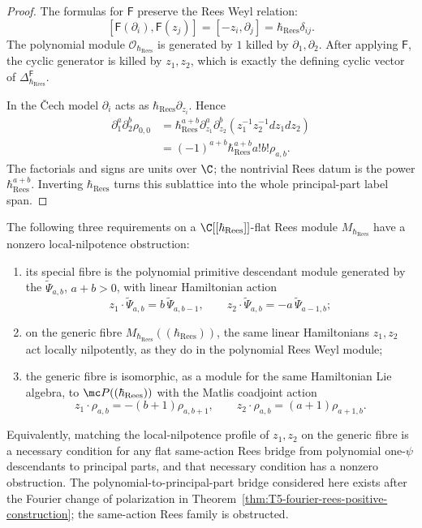 \begin{proof}
  The formulas for \(\mathsf F\) preserve the Rees Weyl relation:
  \[
    [\mathsf F(\partial_i),\mathsf F(z_j)]
      =[-z_i,\partial_j]=\hbar_{\mathrm{Rees}}\delta_{ij}.
  \]
  The polynomial module \(\mathcal O_{\hbar_{\mathrm{Rees}}}\) is generated by \(1\)
  killed by \(\partial_1,\partial_2\).  After applying \(\mathsf F\), the
  cyclic generator is killed by \(z_1,z_2\), which is exactly the
  defining cyclic vector of \(\Delta^{\mathsf F}_{\hbar_{\mathrm{Rees}}}\).

  In the \v{C}ech model \(\partial_i\) acts as
  \(\hbar_{\mathrm{Rees}}\partial_{z_i}\).  Hence
  \[
  \begin{aligned}
    \partial_1^a\partial_2^b\rho_{0,0}
      &=
      \hbar_{\mathrm{Rees}}^{a+b}
      \partial_{z_1}^a\partial_{z_2}^b
      (z_1^{-1}z_2^{-1}dz_1dz_2)  \\
      &=(-1)^{a+b}\hbar_{\mathrm{Rees}}^{a+b}a!b!\rho_{a,b}.
  \end{aligned}
  \]
  The factorials and signs are units over \(\C\); the nontrivial Rees
  datum is the power \(\hbar_{\mathrm{Rees}}^{a+b}\).  Inverting \(\hbar_{\mathrm{Rees}}\) turns this
  sublattice into the whole principal-part label span.
\end{proof}

\begin{thm}
  \label{thm:same-action-rees-fourier-descendants-obstruction}
  The following three requirements on a \(\C[[\hbar_{\mathrm{Rees}}]]\)-flat Rees module
  \(M_{\hbar_{\mathrm{Rees}}}\) have a nonzero local-nilpotence obstruction:
  \begin{enumerate}
    \item its special fibre is the polynomial primitive descendant module
      generated by the \(\widetilde\Psi_{a,b}\), \(a+b>0\), with linear
      Hamiltonian action
      \[
        z_1\cdot\widetilde\Psi_{a,b}=b\,\widetilde\Psi_{a,b-1},
        \qquad
        z_2\cdot\widetilde\Psi_{a,b}=-a\,\widetilde\Psi_{a-1,b};
      \]
    \item on the generic fibre \(M_{\hbar_{\mathrm{Rees}}}((\hbar_{\mathrm{Rees}}))\), the same linear
      Hamiltonians \(z_1,z_2\) act locally nilpotently, as they do in the
      polynomial Rees Weyl module;
    \item the generic fibre is isomorphic, as a module for the same
      Hamiltonian Lie algebra, to
      \(\mc P((\hbar_{\mathrm{Rees}}))\) with the Matlis coadjoint action
      \[
        z_1\cdot\rho_{a,b}=-(b+1)\rho_{a,b+1},\qquad
        z_2\cdot\rho_{a,b}=(a+1)\rho_{a+1,b}.
      \]
  \end{enumerate}
  Equivalently, matching the local-nilpotence profile of \(z_1,z_2\) on
  the generic fibre is a necessary condition for any flat same-action
  Rees bridge from polynomial one-\(\psi\) descendants to principal parts,
  and that necessary condition has a nonzero obstruction.  The
  polynomial-to-principal-part bridge considered here exists after the
  Fourier change of polarization in
  Theorem~\ref{thm:T5-fourier-rees-positive-construction}; the
  same-action Rees family is obstructed.
\end{thm}

